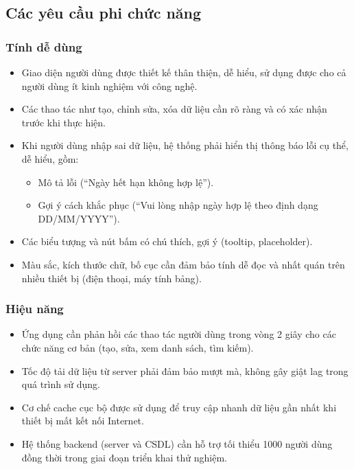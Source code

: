 \subsection{Các yêu cầu phi chức năng}
\subsubsection{Tính dễ dùng}
\begin{itemize}
    \item Giao diện người dùng được thiết kế thân thiện, dễ hiểu, sử dụng được cho cả người dùng ít kinh nghiệm với công nghệ.
    \item Các thao tác như tạo, chỉnh sửa, xóa dữ liệu cần rõ ràng và có xác nhận trước khi thực hiện.
    \item Khi người dùng nhập sai dữ liệu, hệ thống phải hiển thị thông báo lỗi cụ thể, dễ hiểu, gồm:
    \begin{itemize}
        \item Mô tả lỗi (``Ngày hết hạn không hợp lệ'').
        \item Gợi ý cách khắc phục (``Vui lòng nhập ngày hợp lệ theo định dạng DD/MM/YYYY'').
    \end{itemize}
    \item Các biểu tượng và nút bấm có chú thích, gợi ý (tooltip, placeholder).
    \item Màu sắc, kích thước chữ, bố cục cần đảm bảo tính dễ đọc và nhất quán trên nhiều thiết bị (điện thoại, máy tính bảng).
\end{itemize}

\subsubsection{Hiệu năng}
\begin{itemize}
    \item Ứng dụng cần phản hồi các thao tác người dùng trong vòng 2 giây cho các chức năng cơ bản (tạo, sửa, xem danh sách, tìm kiếm).
    \item Tốc độ tải dữ liệu từ server phải đảm bảo mượt mà, không gây giật lag trong quá trình sử dụng.
    \item Cơ chế cache cục bộ được sử dụng để truy cập nhanh dữ liệu gần nhất khi thiết bị mất kết nối Internet.
    \item Hệ thống backend (server và CSDL) cần hỗ trợ tối thiểu 1000 người dùng đồng thời trong giai đoạn triển khai thử nghiệm.
\end{itemize}

